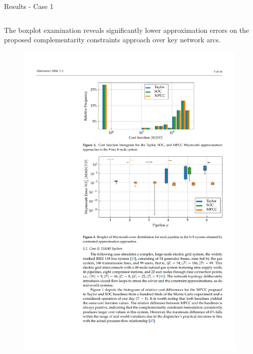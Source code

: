 \documentclass[hyperref={colorlinks,citecolor=blue,linkcolor=blue,urlcolor=blue}]{beamer}
\newlength\figureheight
\newlength\figurewidth
\begin{document}
\begin{frame}{Results - Case 1}
\begin{columns}[t,onlytextwidth]
    \begin{column}{0.48\textwidth}
        The boxplot examination reveals significantly lower approximation errors on the proposed complementarity constraints approach over key network arcs.
        
        \vspace{2.5em}
        \begin{figure}[H]
            \centering
            \setlength{}        
            \setlength{}
            \includegraphics[width=\figurewidth, height=\figureheight]{figures/case1_error.pdf} %
            \label{fig:blue_test_boxplot}
        \end{figure}
    \end{column}
\end{columns}
\end{frame}
\end{document}
